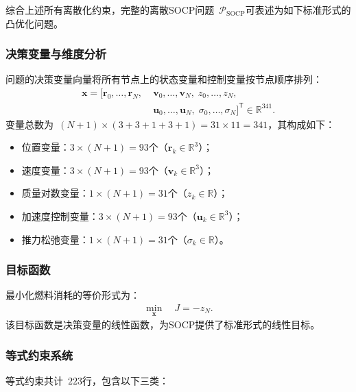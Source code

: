 综合上述所有离散化约束，完整的离散SOCP问题~$\mathcal P_{\text{SOCP}}$可表述为如下标准形式的凸优化问题。

\subsubsection{决策变量与维度分析}

问题的决策变量向量将所有节点上的状态变量和控制变量按节点顺序排列：
\begin{align}
\bm x = [\bm r_0,\dots,\bm r_N,\; &\bm v_0,\dots,\bm v_N,\; z_0,\dots,z_N,\\
&\bm u_0,\dots,\bm u_N,\; \sigma_0,\dots,\sigma_N]^{\mathsf T} \in \mathbb{R}^{341}.
\end{align}
变量总数为~$(N+1)\times(3+3+1+3+1)=31\times11=341$，其构成如下：
\begin{itemize}
  \item 位置变量：$3\times(N+1)=93$个（$\bm r_k\in\mathbb{R}^3$）；
  \item 速度变量：$3\times(N+1)=93$个（$\bm v_k\in\mathbb{R}^3$）；
  \item 质量对数变量：$1\times(N+1)=31$个（$z_k\in\mathbb{R}$）；
  \item 加速度控制变量：$3\times(N+1)=93$个（$\bm u_k\in\mathbb{R}^3$）；
  \item 推力松弛变量：$1\times(N+1)=31$个（$\sigma_k\in\mathbb{R}$）。
\end{itemize}

\subsubsection{目标函数}

最小化燃料消耗的等价形式为：
\begin{align}
\min_{\bm x}\quad J = -z_N.
\end{align}
该目标函数是决策变量的线性函数，为SOCP提供了标准形式的线性目标。

\subsubsection{等式约束系统}

等式约束共计~$223$行，包含以下三类：


